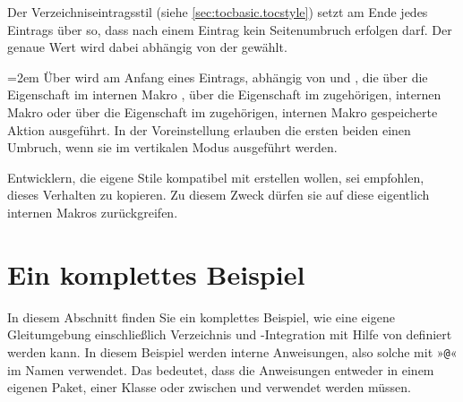 \begin{Declaration}
\end{Declaration}
Der Verzeichniseintragsstil
 (siehe \autoref{sec:tocbasic.tocstyle}) setzt am Ende jedes
Eintrags über   so, dass
nach einem Eintrag kein Seitenumbruch erfolgen darf. Der genaue Wert wird
dabei abhängig von der  gewählt.

\begingroup%
\emergencystretch=2em\relax%
Über  wird am Anfang eines
Eintrags, abhängig von  und , die über
die Eigenschaft  im internen Makro
, über die
Eigenschaft  im zugehörigen, internen Makro
 oder über die
Eigenschaft  im zugehörigen, internen Makro
 gespeicherte Aktion
ausgeführt. In der Voreinstellung erlauben die ersten
beiden einen Umbruch, wenn sie im vertikalen Modus ausgeführt werden.\par%
\endgroup

Entwicklern, die eigene Stile kompatibel mit  erstellen
wollen, sei empfohlen, dieses Verhalten zu kopieren. Zu diesem Zweck dürfen
sie auf diese eigentlich internen Makros zurückgreifen.%
\EndIndexGroup


\section{Ein komplettes Beispiel}

In diesem Abschnitt finden Sie ein komplettes Beispiel, wie eine eigene
Gleitumgebung einschließlich Verzeichnis und \KOMAScript-Integration mit Hilfe
von  definiert werden kann. In diesem Beispiel werden
interne Anweisungen, also solche mit »\texttt{@}« im Namen
verwendet. Das  bedeutet, dass die Anweisungen entweder in
einem eigenen Paket, einer Klasse oder zwischen
%
 und 
verwendet werden müssen.

